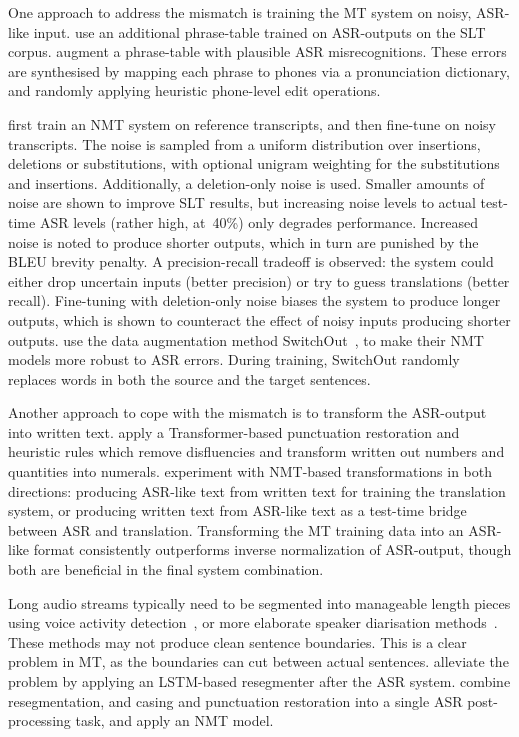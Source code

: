 \documentclass{svjour3}
\begin{document}
One approach to address the mismatch is training the MT system on noisy, ASR-like input. \citet{peitz2012spoken} use an additional phrase-table trained on ASR-outputs on the SLT corpus. \citet{tsvetkov-etal-2014-augmenting-translation} augment a phrase-table with plausible ASR misrecognitions. These errors are synthesised by mapping each phrase to phones via a pronunciation dictionary, and randomly applying heuristic phone-level edit operations. 

\citet{sperber2017toward} first train an NMT system on reference transcripts, and then fine-tune on noisy transcripts. The noise is sampled from a uniform distribution over insertions, deletions or substitutions, with optional unigram weighting for the substitutions and insertions. Additionally, a deletion-only noise is used. Smaller amounts of noise are shown to improve SLT results, but increasing noise levels to actual test-time ASR levels (rather high, at~40\%) only degrades performance. Increased noise is noted to produce shorter outputs, which in turn are punished by the BLEU brevity penalty. A precision-recall tradeoff is observed: the system could either drop uncertain inputs (better precision) or try to guess translations (better recall). Fine-tuning with deletion-only noise biases the system to produce longer outputs, which is shown to counteract the effect of noisy inputs producing shorter outputs. \citet{pham2019iwslt} use the data augmentation method SwitchOut~\citep{wang-etal-2018-switchout}, to make their NMT models more robust to ASR errors. During training, SwitchOut randomly replaces words in both the source and the target sentences.

Another approach to cope with the mismatch is to transform the ASR-output into written text.
\citet{wang-sogou-tiic-2018} apply a Transformer-based punctuation restoration and heuristic rules which remove disfluencies and transform written out numbers and quantities into numerals. \citet{liu2018ustc} experiment with NMT-based transformations in both directions: producing ASR-like text from written text for training the translation system, or producing written text from ASR-like text as a test-time bridge between ASR and translation. Transforming the MT training data into an ASR-like format consistently outperforms inverse normalization of ASR-output, though both are beneficial in the final system combination.

Long audio streams typically need to be segmented into manageable length pieces using voice activity detection~\citep{ramirez2007vad}, or more elaborate speaker diarisation methods~\citep{anguera2012diarization}.
These methods may not produce clean sentence boundaries.
This is a clear problem in MT, as the boundaries can cut between actual sentences. \citet{liu2018ustc} alleviate the problem by applying an LSTM-based resegmenter after the ASR system. \citet{pham2019iwslt} combine resegmentation, and casing and punctuation restoration into a single ASR post-processing task, and apply an NMT model.
\end{document}
